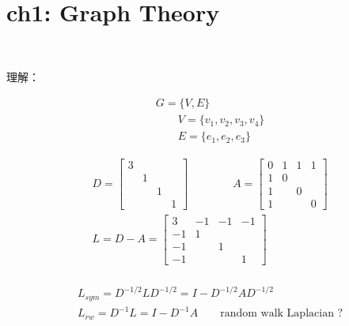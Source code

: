 \documentclass{article}
\begin{document}
\section*{ch1: Graph Theory}


~ \\[3pt]
\begin{CJK}{UTF8}{gbsn}
    理解： \\[3pt]
\end{CJK}


%
\begin{align*}
    & G = \{ V, E \}  \\[3pt]
    & \qquad V = \{ v_{1}, v_{2}, v_{3}, v_{4} \}  \\[3pt]
    & \qquad E = \{ e_{1}, e_{2}, e_{3} \} 
\end{align*}

%
\begin{align*}
    & D = 
        \begin{bmatrix}
            3  &  &  & \\
            &  1  &  & \\
            &  &  1  & \\
            &  &  &  1
        \end{bmatrix} \qquad \qquad 
      A = 
        \begin{bmatrix}
            0 & 1 & 1 & 1 \\
            1 & 0 &   &	  \\
            1 &   & 0 &	  \\
            1 &   &   & 0
        \end{bmatrix}  \\[3pt]
    & L = D - A = 
        \begin{bmatrix}
            3 & -1 & -1 & -1 \\
            -1&  1 &    &	 \\
            -1&    &  1 &	 \\
            -1&    &    &  1
        \end{bmatrix}  \\[3pt]
\end{align*}

%
\begin{align*}
    & L_{sym} = D^{-1/2} L D^{-1/2} = I - D^{-1/2} A D^{-1/2}  \\[3pt]
    & L_{rw}  = D^{-1} L = I - D^{-1} A \qquad \text{random walk Laplacian ?}  \\[3pt]
\end{align*}
\end{document}
